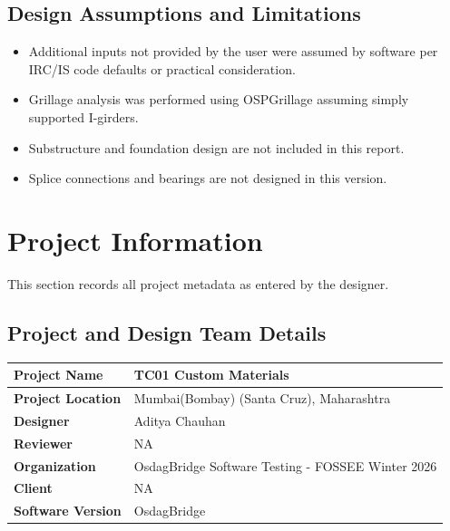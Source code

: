 \documentclass[12pt,a4paper]{report}
\numberwithin{table}{chapter}
\numberwithin{figure}{chapter}
\begin{document}
\section*{Design Assumptions and Limitations}
\label{sec:assumptions}

\begin{itemize}
\item Additional inputs not provided by the user were assumed by software per IRC/IS code defaults or practical consideration.
\item Grillage analysis was performed using OSPGrillage assuming simply supported I-girders.
\item Substructure and foundation design are not included in this report.
\item Splice connections and bearings are not designed in this version.
\end{itemize}

\titleformat{\chapter}[block]{\normalfont\Large\bfseries\centering}{\thechapter}{1em}{}
\titlespacing*{\chapter}{0pt}{-30pt}{10pt}


\chapter{Project Information}

This section records all project metadata as entered by the designer.

\section{Project and Design Team Details}
\label{sec:project-details}

\begin{tabular}{|L{5.5cm}|L{8.5cm}|}
\hline
\textbf{Project Name} & TC01 Custom Materials \\
\hline
\textbf{Project Location} & Mumbai(Bombay) (Santa Cruz), Maharashtra \\
\hline
\textbf{Designer} & Aditya Chauhan \\
\hline
\textbf{Reviewer} & NA \\
\hline
\textbf{Organization} & OsdagBridge Software Testing - FOSSEE Winter 2026 \\
\hline
\textbf{Client} & NA \\
\hline
\textbf{Software Version} & OsdagBridge \\
\hline
\end{tabular}
\end{document}
